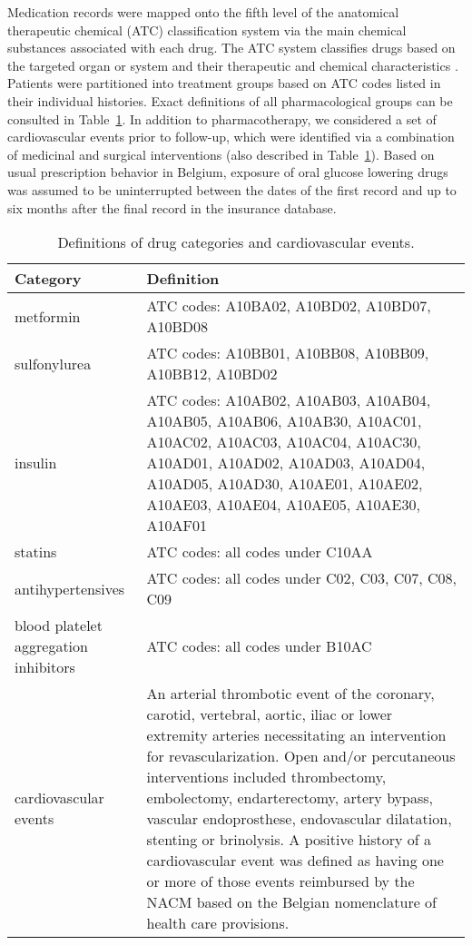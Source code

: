Medication records were mapped onto the fifth level of the anatomical therapeutic chemical (ATC) classification system via the main chemical substances associated with each drug. The ATC system classifies drugs based on the targeted organ or system and their therapeutic and chemical characteristics \citep{s10}. Patients were partitioned into treatment groups based on ATC codes listed in their individual histories. Exact definitions of all pharmacological groups can be consulted in Table~\ref{table:survival-defs}. In addition to pharmacotherapy, we considered a set of cardiovascular events prior to follow-up, which were identified via a combination of medicinal and surgical interventions (also described in Table~\ref{table:survival-defs}). Based on usual prescription behavior in Belgium, exposure of oral glucose lowering drugs was assumed to be uninterrupted between the dates of the first record and up to six months after the final record in the insurance database. 

\begin{table}[!h]
\begin{tabular}{p{}p{}}
\toprule
Category        & Definition \\
\midrule
metformin       & ATC codes: A10BA02, A10BD02, A10BD07, A10BD08 \\
sulfonylurea    & ATC codes: A10BB01, A10BB08, A10BB09, A10BB12, A10BD02 \\
insulin         & ATC codes: A10AB02, A10AB03, A10AB04, A10AB05, A10AB06, A10AB30, A10AC01, A10AC02, A10AC03, A10AC04, A10AC30, A10AD01, A10AD02, A10AD03, A10AD04, A10AD05, A10AD30, A10AE01, A10AE02, A10AE03, A10AE04, A10AE05, A10AE30, A10AF01 \\
statins         & ATC codes: all codes under C10AA \\
antihypertensives       & ATC codes: all codes under C02, C03, C07, C08, C09 \\
blood platelet aggregation inhibitors & ATC codes: all codes under B10AC \\
\midrule
cardiovascular events & An arterial thrombotic event of the coronary, carotid, vertebral, aortic, iliac or lower extremity arteries necessitating an intervention for revascularization. Open and/or percutaneous interventions included thrombectomy, embolectomy, endarterectomy, artery bypass, vascular endoprosthese, endovascular dilatation, stenting or brinolysis. A positive history of a cardiovascular event was defined as having one or more of those events reimbursed by the NACM based on the Belgian nomenclature of health care provisions. \\
\bottomrule
\end{tabular}
\caption{Definitions of drug categories and cardiovascular events.} \label{table:survival-defs}
\end{table}


